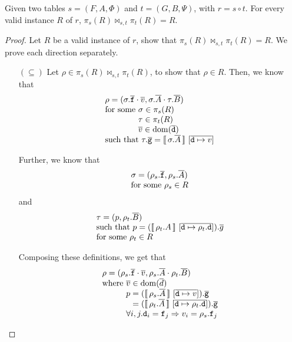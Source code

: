 \begin{proposition}
  \label{prop:join-proj}
  Given two tables $s = (F,A,\Phi)$ and $t = (G,B, \Psi)$, with
  $r = s \circ t$. For every valid instance $R$ of $r$,
  $\pi_s(R) \bowtie_{s,t} \pi_t(R) = R$.
\end{proposition}

\begin{proof}
  Let $R$ be a valid instance of $r$, show that
  $\pi_s(R) \bowtie_{s,t} \pi_t(R) = R$. We prove each direction
  separately.
  \begin{enumerate}[align=left]
  \item[$(\subseteq)$] Let $\rho \in \pi_s(R) \bowtie_{s,t} \pi_t(R)$,
    to show that $\rho \in R$. Then, we know that
    \[\begin{array}l
        \rho = (\sigma.\vec{\var f} \cdot \vec v, \sigma.\vec A \cdot \tau.\vec B)\\
        \text{for some } \sigma \in \pi_s(R)\\
        \phantom{\text{for some }}\tau \in \pi_t(R)\\
        \phantom{\text{for some }} \vec v \in \dom(\vec{\var d})\\ 
        \text{such that } \tau.\vec{\var g} = \bracbb{\sigma.\vec A}~[\overline{\var d \mapsto v}] %
      \end{array} \]

    Further, we know that
    \[\begin{array}l
        \sigma = (\rho_s.\vec{\var f}, \rho_s.\vec A)\\
        \text{for some } \rho_s \in R\\
      \end{array}
    \]
    and
    \[\begin{array}l  
        \tau = (p, \rho_t.\vec B) \\
        \text{such that } p = (\bracbb{\rho_t.A}~[\overline{\var d \mapsto \rho_t.\var d}]).\vec g \\
        \text{for some } \rho_t \in R
      \end{array}\]

    Composing these definitions, we get that
    \[\begin{array}l
        \rho = (\rho_s.\vec{\var f} \cdot \vec v, \rho_s.\vec A \cdot \rho_t.\vec B) \\
        \text{where } \vec v \in \dom(\vec d)\\
        \phantom{\text{where }} p = (\bracbb{\rho_s.\vec A}~[\overline{\var d \mapsto v}]).\vec{\var g}\\
        \phantom{\text{where } p} = (\bracbb{\rho_t.\vec A}~[\overline{\var d \mapsto \rho_t.\var d}]).\vec{\var g} \\
        \phantom{\text{where }} \forall i,j. \var d_i = \var f_j \Rightarrow v_i = \rho_s.\var f_j
      \end{array}\]
    

\end{enumerate}
\end{proof}
